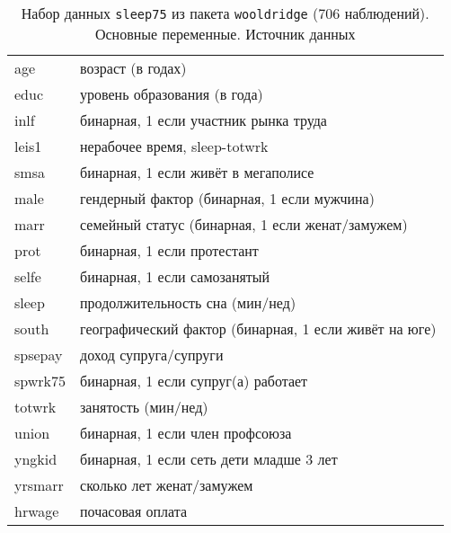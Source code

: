 \documentclass[12pt]{article}
\theoremstyle{remark}
\begin{document}
\begin{table}
	\caption{Набор данных \texttt{sleep75} из пакета \texttt{wooldridge} (706  наблюдений). 
	Основные переменные. Источник данных \cite{sleep75}}
	\label{sleep75}
	\begin{tabular}{l|l}\hline
	age & возраст (в годах)  \\
	educ & уровень образования (в года) \\
	inlf & бинарная, 1 если участник рынка труда \\
	leis1 & нерабочее время, sleep-totwrk \\
	smsa  & бинарная, 1 если живёт в мегаполисе \\
	male & гендерный фактор (бинарная, 1 если мужчина) \\
	marr & семейный статус (бинарная, 1 если женат/замужем) \\
	prot & бинарная, 1 если протестант \\
	selfe & бинарная, 1 если самозанятый \\
	sleep & продолжительность сна (мин/нед) \\
	south & географический фактор (бинарная, 1 если живёт на юге) \\
	spsepay & доход супруга/супруги \\
	spwrk75 & бинарная, 1 если супруг(а) работает \\
	totwrk & занятость (мин/нед) \\
	union & бинарная, 1 если член профсоюза \\
	yngkid & бинарная, 1 если сеть дети младше 3 лет \\
	yrsmarr & сколько лет женат/замужем \\
	hrwage & почасовая оплата \\
	\hline
	\end{tabular}
\end{table}

\end{document}
